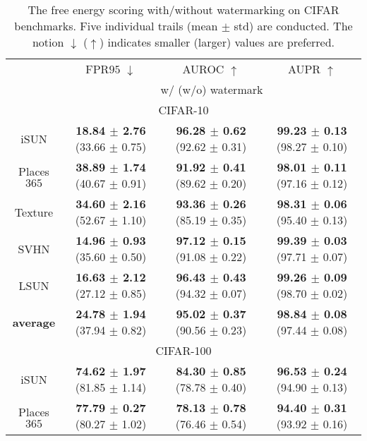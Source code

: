 \documentclass{article}
\begin{document}
\begin{table}[!thp]
\centering
\caption{The free energy scoring with/without watermarking on CIFAR benchmarks. Five individual trails (mean $\pm$ std) are conducted. The notion $\downarrow$ ($\uparrow$) indicates smaller (larger) values are preferred.} \label{tab: free energy_ms}
\vspace{5pt}
\scriptsize{
\begin{tabular}{c|ccc}
\toprule[1.5pt]
                   & FPR$95$ $\downarrow$     & AUROC $\uparrow$       & AUPR $\uparrow$      \\
                   \cline{2-4} 
\multirow{-2}{*}{} & \multicolumn{3}{c}{w/ (w/o) watermark} \\
\midrule[0.6pt]
\multicolumn{4}{c}{\cellcolor{greyL}CIFAR-10} \\
\midrule[0.6pt]
iSUN               & \textbf{18.84 $\pm$ 2.76} (33.66 $\pm$ 0.75) & \textbf{96.28 $\pm$ 0.62} (92.62 $\pm$ 0.31) & \textbf{99.23 $\pm$ 0.13} (98.27 $\pm$ 0.10) \\
Places$365$          & \textbf{38.89 $\pm$ 1.74} (40.67 $\pm$ 0.91) & \textbf{91.92 $\pm$ 0.41} (89.62 $\pm$ 0.20) & \textbf{98.01 $\pm$ 0.11} (97.16 $\pm$ 0.12) \\
Texture            & \textbf{34.60 $\pm$ 2.16} (52.67 $\pm$ 1.10) & \textbf{93.36 $\pm$ 0.26} (85.19 $\pm$ 0.35) & \textbf{98.31 $\pm$ 0.06} (95.40 $\pm$ 0.13) \\
SVHN               & \textbf{14.96 $\pm$ 0.93} (35.60 $\pm$ 0.50) & \textbf{97.12 $\pm$ 0.15} (91.08 $\pm$ 0.22) & \textbf{99.39 $\pm$ 0.03} (97.71 $\pm$ 0.07) \\
LSUN             & \textbf{16.63 $\pm$ 2.12} (27.12 $\pm$ 0.85) & \textbf{96.43 $\pm$ 0.43} (94.32 $\pm$ 0.07) & \textbf{99.26 $\pm$ 0.09} (98.70 $\pm$ 0.02) \\
\midrule
\textbf{average}   & \textbf{24.78 $\pm$ 1.94} (37.94 $\pm$ 0.82) & \textbf{95.02 $\pm$ 0.37} (90.56 $\pm$ 0.23) & \textbf{98.84 $\pm$ 0.08} (97.44 $\pm$ 0.08) \\ \midrule[1pt]
\multicolumn{4}{c}{\cellcolor{greyL}CIFAR-100} \\
\midrule[1pt]
iSUN               & \textbf{74.62 $\pm$ 1.97} (81.85 $\pm$ 1.14) & \textbf{84.30 $\pm$ 0.85} (78.78 $\pm$ 0.40) & \textbf{96.53 $\pm$ 0.24} (94.90 $\pm$ 0.13) \\ 
Places$365$        & \textbf{77.79 $\pm$ 0.27} (80.27 $\pm$ 1.02) & \textbf{78.13 $\pm$ 0.78} (76.46 $\pm$ 0.54) & \textbf{94.40 $\pm$ 0.31} (93.92 $\pm$ 0.16) \\

\end{tabular}}
\end{table}
\end{document}
